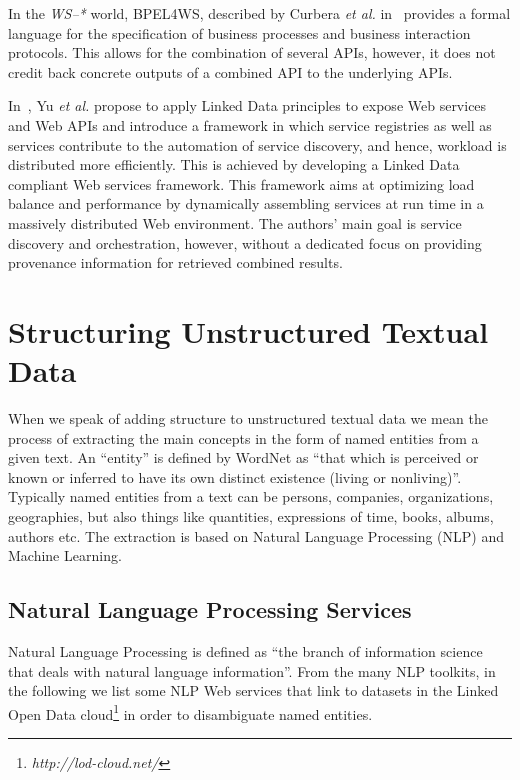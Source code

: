 \documentclass[twocolumn]{article}
\begin{document}
In the \emph{WS--*} world, BPEL4WS, described by Curbera \emph{et al.} in~\cite{Curbera:2003:NSW:944217.944234} provides a formal language for the specification of business processes and business interaction protocols. This allows for the combination of several APIs, however, it does not credit back concrete outputs of a combined API to the underlying APIs.

In~\cite{Yu}, Yu \emph{et al.} propose to apply Linked Data principles to expose 
Web services and Web APIs and introduce a framework in which 
service registries as well as services contribute to the automation 
of service discovery, and hence, workload  is distributed more 
efficiently. This is achieved by developing a Linked Data 
compliant Web services framework. This framework aims at 
optimizing load balance and performance by dynamically 
assembling services at run time in a massively distributed Web 
environment.
The authors' main goal is service discovery and orchestration, however, without a dedicated focus on providing provenance information for retrieved combined results.

\section{Structuring Unstructured Textual Data} \label{sec:structuring}
When we speak of adding structure to unstructured textual data we mean the process of extracting the main concepts in the form of named entities from a given text. An ``entity'' is defined by WordNet as ``that which is perceived or known or inferred to have its own distinct existence (living or nonliving)''. Typically named entities from a text can be persons, companies, organizations, geographies, but also things like quantities, expressions of time, books, albums, authors etc. The extraction is based on Natural Language Processing (NLP) and Machine Learning.

\subsection{Natural Language Processing Services}\label{sec:nlp-services}
Natural Language Processing is defined as ``the branch of information science that deals with natural language information''. From the many NLP toolkits, in the following we list some NLP Web services that link to datasets in the Linked Open Data
cloud\footnote{\textit{http://lod-cloud.net/}} in order to disambiguate named entities.
\end{document}
